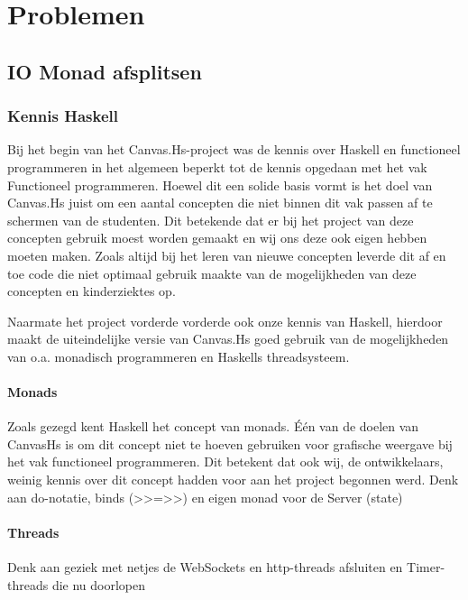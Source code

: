 \section{Problemen}
\subsection{IO Monad afsplitsen}


\subsubsection{Kennis Haskell}
Bij het begin van het Canvas.Hs-project was de kennis over Haskell en functioneel programmeren in het algemeen beperkt tot de kennis opgedaan met het vak Functioneel programmeren. Hoewel dit een solide basis vormt is het doel van Canvas.Hs juist om een aantal concepten die niet binnen dit vak passen af te schermen van de studenten. Dit betekende dat er bij het project van deze concepten gebruik moest worden gemaakt en wij ons deze ook eigen hebben moeten maken. Zoals altijd bij het leren van nieuwe concepten leverde dit af en toe code die niet optimaal gebruik maakte van de mogelijkheden van deze concepten en kinderziektes op. 

Naarmate het project vorderde vorderde ook onze kennis van Haskell, hierdoor maakt de uiteindelijke versie van Canvas.Hs goed gebruik van de mogelijkheden van o.a. monadisch programmeren en Haskells threadsysteem. 
\paragraph{Monads}
Zoals gezegd kent Haskell het concept van monads. Één van de doelen van CanvasHs is om dit concept niet te hoeven gebruiken voor grafische weergave bij het vak functioneel programmeren. Dit betekent dat ook wij, de ontwikkelaars, weinig kennis over dit concept hadden voor aan het project begonnen werd.
Denk aan do-notatie, binds (>>=>>) en eigen monad voor de Server (state)
\paragraph{Threads}
Denk aan geziek met netjes de WebSockets en http-threads afsluiten en Timer-threads die nu doorlopen

